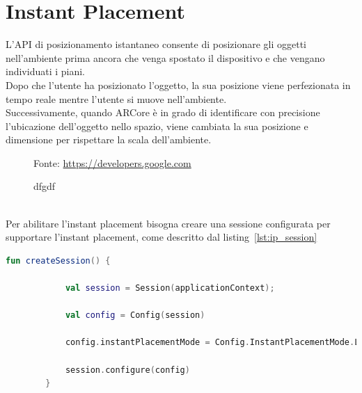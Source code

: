 \documentclass[crop=false, class=book]{standalone}
\begin{document}
	\chapter{Instant Placement}
	L'API di posizionamento istantaneo consente di posizionare gli oggetti nell’ambiente prima ancora che venga spostato il dispositivo e che vengano individuati i piani. \\
	\noindent
	Dopo che l’utente ha posizionato l’oggetto, la sua posizione viene perfezionata in tempo reale mentre l’utente si muove nell’ambiente.
	\\
	\noindent
	Successivamente, quando ARCore è in grado di identificare con precisione l’ubicazione dell’oggetto nello spazio, viene cambiata la sua posizione e dimensione per rispettare la scala dell’ambiente.
	\begin{figure}
		\centering
		{Fonte: \url{https://developers.google.com}}
		\caption{dfgdf}
		\label{fig:light_effects}
	\end{figure}
	\\
	\noindent
	Per abilitare l’instant placement bisogna creare una sessione configurata per supportare l’instant placement, come descritto dal listing~\vref{lst:ip_session}
		
	\begin{center}
		\begin{minipage}{0.95\textwidth}
			\begin{lstlisting}[caption={Descrizione del listing.}, label={lst:ip_session}, language=Kotlin]
			fun createSession() {
				
			val session = Session(applicationContext);
			
			val config = Config(session)
			
			config.instantPlacementMode = Config.InstantPlacementMode.LOCAL_Y_UP
			
			session.configure(config)
		}
		\end{lstlisting}
		\end{minipage}
	\end{center}
\end{document}
